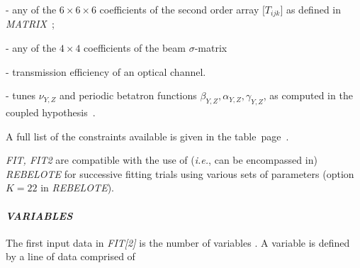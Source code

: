 \noindent - any of the
$6\times 6 \times6 $ coefficients of the second order array $ \lbrack T_{ijk}\rbrack $ 
as defined in \textsl{MATRIX}~; 

\noindent - any of the $ 4 \times 4 $ coefficients of the beam \mbox{$\sigma$-matrix} 

\noindent - transmission efficiency of an optical channel. 

\noindent - tunes $\nu_{Y,Z}$ and  periodic betatron functions $\beta_{Y,Z}, \alpha_{Y,Z}, \gamma_{Y,Z}$,  
 as computed in the coupled hypothesis~\cite{Coupling}. 


\medskip

\noindent A full list of the constraints available is given in the table~page~\pageref{TabFITZlst1}. 

\medskip

\noindent \textsl{FIT, FIT2}  are compatible with the use of (\emph{i.e.}, can be encompassed in)  
\textsl{REBELOTE}  for successive fitting  
trials using various sets of parameters (option $K=22$ in \textsl{REBELOTE}). 


\paragraph{\textit{VARIABLES}}

\noindent The first input data in \textsl{FIT[2]} is the number of variables
\textsl{\NV}. A variable is defined by a line of data comprised of 

\smallskip

